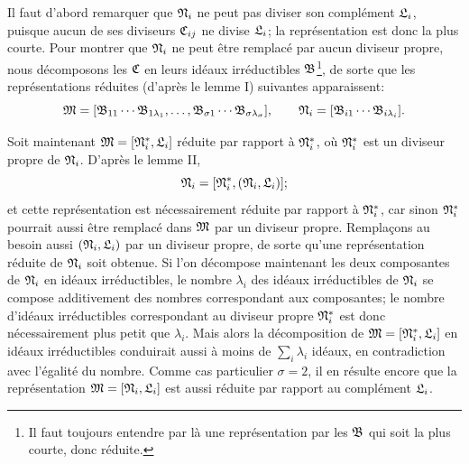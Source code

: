 Il faut d'abord remarquer que $\mathfrak{N}_i$ ne peut pas diviser son complément $\mathfrak{L}_i$, puisque aucun de ses diviseurs $\mathfrak{C}_{ij}$ ne divise $\mathfrak{L}_i$; la représentation est donc la plus courte. Pour montrer que $\mathfrak{N}_i$ ne peut être remplacé par aucun diviseur propre, nous décomposons les $\mathfrak{C}$ en leurs idéaux irréductibles $\mathfrak{B}$\footnote{Il faut toujours entendre par là une représentation par les $\mathfrak{B}$ qui soit la plus courte, donc réduite.}, de sorte que les représentations réduites (d'après le lemme I) suivantes apparaissent:
\[
 \mathfrak{M}=[\mathfrak{B}_{11}\cdots\mathfrak{B}_{1\lambda_1},\ldots,
           \mathfrak{B}_{\sigma1}\cdots\mathfrak{B}_{\sigma\lambda_\sigma}],
 \qquad
 \mathfrak{N}_i=[\mathfrak{B}_{i1}\cdots\mathfrak{B}_{i\lambda_i}].
\]

Soit maintenant $\mathfrak{M}=[\mathfrak{N}_i^*,\mathfrak{L}_i]$ réduite par rapport à $\mathfrak{N}_i^*$, où $\mathfrak{N}_i^*$ est un diviseur propre de $\mathfrak{N}_i$. D'après le lemme II,
\[
 \mathfrak{N}_i=[\mathfrak{N}_i^*, (\mathfrak{N}_i,\mathfrak{L}_i)];
\]
et cette représentation est nécessairement réduite par rapport à $\mathfrak{N}_i^*$, car sinon $\mathfrak{N}_i^*$ pourrait aussi être remplacé dans $\mathfrak{M}$ par un diviseur propre. Remplaçons au besoin aussi $(\mathfrak{N}_i,\mathfrak{L}_i)$ par un diviseur propre, de sorte qu'une représentation réduite de $\mathfrak{N}_i$ soit obtenue. Si l'on décompose maintenant les deux composantes de $\mathfrak{N}_i$ en idéaux irréductibles, le nombre $\lambda_i$ des idéaux irréductibles de $\mathfrak{N}_i$ se compose additivement des nombres correspondant aux composantes; le nombre d'idéaux irréductibles correspondant au diviseur propre $\mathfrak{N}_i^*$ est donc nécessairement plus petit que $\lambda_i$. Mais alors la décomposition de $\mathfrak{M}=[\mathfrak{N}_i^*,\mathfrak{L}_i]$ en idéaux irréductibles conduirait aussi à moins de $\sum_i\lambda_i$ idéaux, en contradiction avec l'égalité du nombre. Comme cas particulier $\sigma=2$, il en résulte encore que la représentation $\mathfrak{M}=[\mathfrak{N}_i,\mathfrak{L}_i]$ est aussi réduite par rapport au complément $\mathfrak{L}_i$.
